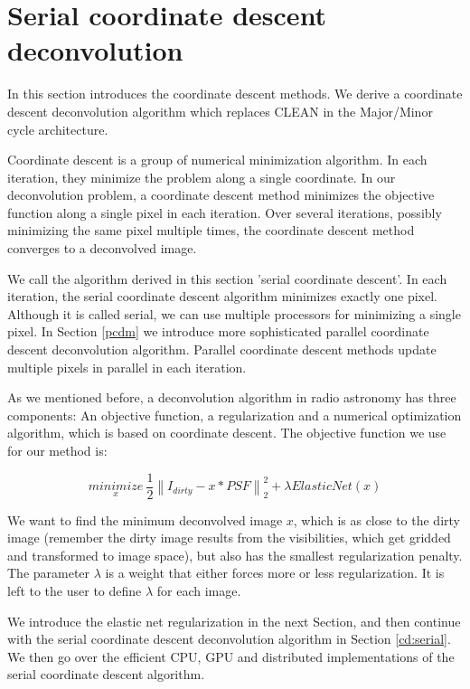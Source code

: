 \section{Serial coordinate descent deconvolution}\label{cd}
In this section introduces the coordinate descent methods. We derive a coordinate descent deconvolution algorithm which replaces CLEAN in the Major/Minor cycle architecture.

Coordinate descent is a group of numerical minimization algorithm. In each iteration, they minimize the problem along a single coordinate. In our deconvolution problem, a coordinate descent method minimizes the objective function along a single pixel in each iteration. Over several iterations, possibly minimizing the same pixel multiple times, the coordinate descent method converges to a deconvolved image.

We call the algorithm derived in this section 'serial coordinate descent'. In each iteration, the serial coordinate descent algorithm minimizes exactly one pixel. Although it is called serial, we can use multiple processors for minimizing a single pixel. In Section \ref{pcdm} we introduce more sophisticated parallel coordinate descent deconvolution algorithm. Parallel coordinate descent methods update multiple pixels in parallel in each iteration.

As we mentioned before, a deconvolution algorithm in radio astronomy has three components: An objective function, a regularization and a numerical optimization algorithm, which is based on coordinate descent. The objective function we use for our method is: 

\begin{equation}\label{cd:deconv}
\underset{x}{minimize} \: \frac{1}{2} \left \| I_{dirty} - x * PSF \right \|_2^2 + \lambda ElasticNet(x)
\end{equation}

We want to find the minimum deconvolved image $x$, which is as close to the dirty image (remember the dirty image results from the visibilities, which get gridded and transformed to image space), but also has the smallest regularization penalty. The parameter $\lambda$ is a weight that either forces more or less regularization. It is left to the user to define $\lambda$ for each image. 

We introduce the elastic net regularization in the next Section, and then continue with the serial coordinate descent deconvolution algorithm in Section \ref{cd:serial}. We then go over the efficient CPU, GPU and distributed implementations of the serial coordinate descent algorithm.


